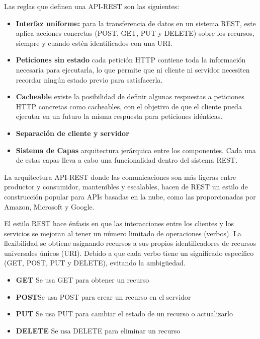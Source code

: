 Las reglas que definen una API-REST son las siguientes:
\begin{itemize}
    \item \textbf {Interfaz uniforme: } para la transferencia de datos en un sistema REST, este aplica acciones concretas (POST, GET, PUT y DELETE) sobre los recursos, siempre y cuando estén identificados con una URI.
    \item \textbf {Peticiones sin estado} cada petición HTTP contiene toda la información necesaria para ejecutarla, lo que permite que ni cliente ni servidor necesiten recordar ningún estado previo para satisfacerla.
    \item \textbf {Cacheable} existe la posibilidad de definir algunas respuestas a peticiones HTTP concretas como cacheables, con el objetivo de que el cliente pueda ejecutar en un futuro la misma respuesta para peticiones idénticas.
    \item \textbf {Separación de cliente y servidor}
    \item \textbf {Sistema de Capas} arquitectura jerárquica entre los componentes. Cada una de estas capas lleva a cabo una funcionalidad dentro del sistema REST.
\end{itemize}

La arquitectura API-REST donde las comunicaciones son más ligeras entre productor y consumidor, mantenibles y escalables, hacen de REST un estilo de construcción popular para APIs basadas en la nube, como las proporcionadas por Amazon, Microsoft y Google.

El estilo REST hace énfasis en que las interacciones entre los clientes y los servicios se mejoran al tener un número limitado de operaciones (verbos). La flexibilidad se obtiene asignando recursos a sus propios identificadores de recursos universales únicos (URI). Debido a que cada verbo tiene un significado específico (GET, POST, PUT y DELETE), evitando la ambigüedad.
\begin{itemize}
    \item \textbf {GET} Se usa GET para obtener un recurso
    \item \textbf {POST}Se usa POST para crear un recurso en el servidor
    \item \textbf {PUT} Se usa PUT para cambiar el estado de un recurso o actualizarlo
    \item \textbf {DELETE} Se usa DELETE para eliminar un recurso
\end{itemize}

